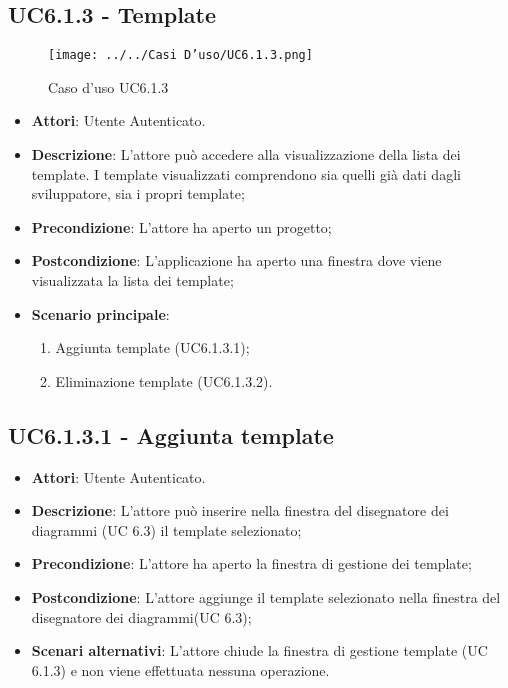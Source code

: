 \subsection{UC6.1.3 - Template} 
\label{ssec:UC6.1.3} 
\begin{figure}[h!] 
\centering 
\texttt{[image: ../../Casi D'uso/UC6.1.3.png]} 
\caption{Caso d'uso UC6.1.3} 
 \end{figure} 
\begin{itemize} 
\item \textbf{Attori}: Utente Autenticato.
\item \textbf{Descrizione}: L’attore può accedere alla visualizzazione della lista dei template. I template visualizzati comprendono sia quelli già dati dagli sviluppatore, sia i propri template;
\item \textbf{Precondizione}: L’attore ha aperto un progetto;
\item \textbf{Postcondizione}: L'applicazione ha aperto una finestra dove viene visualizzata la lista dei template;
\item \textbf{Scenario principale}: \begin{enumerate}\item Aggiunta template (UC6.1.3.1);\item Eliminazione template (UC6.1.3.2). 
 \end{enumerate}
\end{itemize} 
\subsection{UC6.1.3.1 - Aggiunta template} 
\label{ssec:UC6.1.3.1} 
\begin{itemize} 
\item \textbf{Attori}: Utente Autenticato.
\item \textbf{Descrizione}: L'attore può inserire nella finestra del disegnatore dei diagrammi (UC 6.3) il template selezionato;
\item \textbf{Precondizione}: L'attore ha aperto la finestra di gestione dei template;
\item \textbf{Postcondizione}: L'attore aggiunge il template selezionato nella finestra del disegnatore dei diagrammi(UC 6.3);
\item \textbf{Scenari alternativi}: L'attore chiude la finestra di gestione template (UC 6.1.3) e non viene effettuata nessuna operazione.
\end{itemize} 
